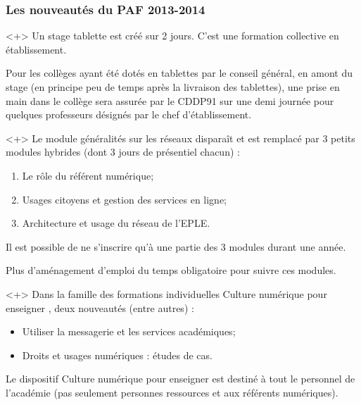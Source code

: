 \documentclass[french]{beamer}
\begin{document}
\begin{frame}%
\frametitle{Les nouveautés du PAF 2013-2014}

\begin{onlyenv}<+>
Un \alert{stage tablette} est créé sur 2 jours. C'est une formation
collective en établissement.
\bigskip

Pour les collèges ayant été dotés en tablettes par le conseil général,
en amont du stage (en principe peu de temps
après la livraison des tablettes), une prise en main dans le collège sera assurée par
le CDDP91 sur une demi journée pour quelques professeurs désignés par le chef
d'établissement.
\end{onlyenv}

\begin{onlyenv}<+>
Le module \og généralités sur les réseaux \fg{} disparaît
et est \alert{remplacé par 3 petits modules} hybrides
(dont 3 jours de présentiel chacun) :

\begin{enumerate}
\item Le rôle du référent numérique;
\item Usages citoyens et gestion des services en ligne;
\item Architecture et usage du réseau de l'EPLE.
\end{enumerate}

Il est possible de ne s'inscrire qu'à une partie des 3 modules
durant une année.
\medskip

Plus d'aménagement d'emploi du temps obligatoire pour suivre ces modules.

\end{onlyenv}

\begin{onlyenv}<+>
Dans la famille des formations individuelles \og Culture numérique pour enseigner \fg{},
deux nouveautés (entre autres) :
\begin{itemize}
\item Utiliser la messagerie et les services académiques;
\item Droits et usages numériques : études de cas.
\end{itemize}
\bigskip

Le dispositif \og Culture numérique pour enseigner \fg{}
est \alert{destiné à tout le personnel de l'académie} (pas seulement personnes
ressources et aux référents numériques).
\end{onlyenv}


\end{frame}
\end{document}
